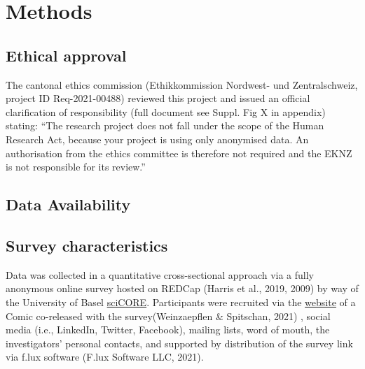 \documentclass[
  english,
  man]{apa6}
\begin{document}
\hypertarget{methods}{%
\section{Methods}\label{methods}}

\hypertarget{ethical-approval}{%
\subsection{Ethical approval}\label{ethical-approval}}

The cantonal ethics commission (Ethikkommission Nordwest- und Zentralschweiz, project ID Req-2021-00488) reviewed this project and issued an official clarification of responsibility (full document see Suppl. Fig X in appendix) stating: ``The research project does not fall under the scope of the Human Research Act, because your project is using only anonymised data. An authorisation from the ethics committee is therefore not required and the EKNZ is not responsible for its review.''

\hypertarget{data-availability}{%
\subsection{Data Availability}\label{data-availability}}

\hypertarget{survey-characteristics}{%
\subsection{Survey characteristics}\label{survey-characteristics}}

Data was collected in a quantitative cross-sectional approach via a fully anonymous online survey hosted on REDCap (Harris et al., 2019, 2009) by way of the University of Basel \href{https://redcap.scicore.unibas.ch}{sciCORE}. Participants were recruited via the \href{https://enlightenyourclock.org/participate-in-research}{website} of a Comic co-released with the survey(Weinzaepflen \& Spitschan, 2021) , social media (i.e., LinkedIn, Twitter, Facebook), mailing lists, word of mouth, the investigators' personal contacts, and supported by distribution of the survey link via f.lux software (F.lux Software LLC, 2021).
\end{document}

